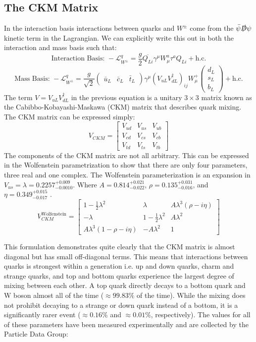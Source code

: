 \subsection{The CKM Matrix}
\label{sec:CKM}
In the interaction basis interactions between quarks and $W^\pm$ come from the $\bar{\psi}\slashed{D}\psi$ kinetic term in the Lagrangian.  We can explicitly write this out in both the interaction and mass basis such that:
\[\text{Interaction Basis: } -\mathcal{L}^q_{W^\pm} =\frac{g}{2}\overline{Q_{Li}}\gamma^{\mu}W_{\mu}^a\tau^a Q_{Li} +\text{h.c.}\]
\[\text{Mass Basis: } -\mathcal{L}^q_{W^\pm} =\frac{g}{\sqrt{2}}\begin{pmatrix}\bar{u}_L &\bar{c}_L &\bar{t}_L\end{pmatrix}\gamma^\mu (V_{uL}V_{dL}^{\dagger})_{ij}W_{\mu}^+ \begin{pmatrix} d_L \\s_L \\b_L\end{pmatrix}+\text{h.c.} \]
The term $V=V_{uL}V_{dL}^{\dagger}$ in the previous equation is a unitary $3\times3$ matrix known as the Cabibbo-Kobayashi-Maskawa (CKM) matrix \cite{CKM1,CKM2} that describes quark mixing.  The CKM matrix can be expressed simply:
\[
V_{CKM} = 
\begin{bmatrix}
V_{ud} & V_{us} & V_{ub} \\
V_{cd} & V_{cs} & V_{cb} \\
V_{td} & V_{ts} & V_{tb}
\end{bmatrix}
\]
The components of the CKM matrix are not all arbitrary.  This can be expressed in the Wolfenstein parametrization\cite{Wolfenstein} to show that there are only four parameters, three real and one complex.  The Wolfenstein parameterization is an expansion in $V_{us}=\lambda= 0.2257^{+0.009}_{-0.0010}$. Where $A=0.814^{+0.021}_{-0.022}$, $\rho=0.135^{+0.031}_{-0.016}$, and $\eta = 0.349^{+0.015}_{-0.017}$ \cite{PDG2018}.
\[
V_{CKM}^\text{Wolfenstein} = 
\begin{bmatrix}
1-\frac{1}{2}\lambda^2 	& \lambda			  & A \lambda^3(\rho - i \eta) \\
-\lambda 			& 1-\frac{1}{2}\lambda^2	  & A\lambda^2 \\
A\lambda^3(1-\rho -i\eta) & -A \lambda^2		 & 1
\end{bmatrix}
\]

This formulation demonstrates quite clearly that the CKM matrix is almost diagonal but has small off-diagonal terms.  This means that interactions between quarks is strongest within a generation i.e. up and down quarks, charm and strange quarks, and top and bottom quarks experience the largest degree of mixing between each other.  A top quark directly decays to a bottom quark and W boson almost all of the time ($\approx 99.83\%$ of the time).  While the mixing does not prohibit decaying to a strange or down quark instead of a bottom, it is a significantly rarer event ($\approx 0.16\%$ and $\approx 0.01\%$, respectively).  The values for all of these parameters have been measured experimentally and are collected by the Particle Data Group\cite{PDG2018}: 

